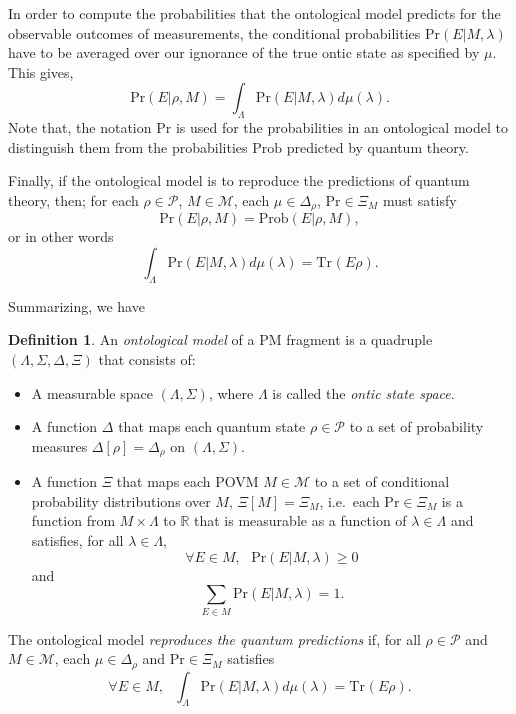 \documentclass[DIV=calc,paper=a4,fontsize=11pt,twocolumn]{scrartcl} %
\theoremstyle{definition}
\newtheorem{definition}{Definition}[section]
\theoremstyle{plain}
\newcommand{\Tr}[2][]{\ensuremath{\text{Tr}_{#1} \left ( #2 \right )}}
\begin{document}
In order to compute the probabilities that the ontological model
predicts for the observable outcomes of measurements, the conditional
probabilities $\text{Pr}(E|M,\lambda)$ have to be averaged over our
ignorance of the true ontic state as specified by $\mu$.  This
gives,
\begin{equation}
\text{Pr}(E|\rho,M) = \int_{\Lambda} \text{Pr}(E|M,\lambda)
d\mu(\lambda).
\end{equation}
Note that, the notation $\text{Pr}$ is used for the probabilities in
an ontological model to distinguish them from the probabilities
$\text{Prob}$ predicted by quantum theory.

Finally, if the ontological model is to reproduce the predictions of
quantum theory, then; for each $\rho \in \mathcal{P}$, $M \in
\mathcal{M}$, each $\mu \in \Delta_{\rho}$, $\text{Pr} \in \Xi_M$ must
satisfy
\begin{equation}
\label{eq:Form:Rep}
\text{Pr}(E|\rho,M) = \text{Prob}(E|\rho,M),
\end{equation}
or in other words
\begin{equation}
\label{eq:Form:RepQ}
\int_{\Lambda} \text{Pr}(E|M,\lambda) d\mu(\lambda) = \Tr{E \rho}.
\end{equation}

Summarizing, we have
\begin{definition}
\label{def:Form:OM}
An \emph{ontological model} of a PM fragment is a
quadruple $(\Lambda, \Sigma, \Delta, \Xi)$ that consists of:
\begin{itemize}
\item A measurable space $(\Lambda, \Sigma)$, where $\Lambda$ is
called the \emph{ontic state space}.
\item A function $\Delta$ that maps each quantum state $\rho \in
\mathcal{P}$ to a set of probability measures $\Delta[\rho] =
\Delta_{\rho}$ on $(\Lambda,\Sigma)$.
\item A function $\Xi$ that maps each POVM $M \in \mathcal{M}$ to a
set of conditional probability distributions over $M$, $\Xi[M] =
\Xi_M$, i.e.\ each $\text{Pr} \in \Xi_M$ is a function from $M
\times \Lambda$ to $\mathbb{R}$ that is measurable as a function
of $\lambda \in \Lambda$ and satisfies, for all $\lambda \in
\Lambda$,
\begin{equation}
\forall E \in M, \,\,\,\, \text{Pr}(E|M,\lambda) \geq 0
\end{equation}
and
\begin{equation}
\sum_{E \in M} \text{Pr}(E|M,\lambda) = 1.
\end{equation}
\end{itemize}

The ontological model \emph{reproduces the quantum predictions} if,
for all $\rho \in \mathcal{P}$ and $M \in \mathcal{M}$, each $\mu
\in \Delta_{\rho}$ and $\text{Pr} \in \Xi_M$ satisfies
\begin{equation}
\label{eq:Form:Rep2}
\forall E \in M, \,\,\,\, \int_{\Lambda} \text{Pr}(E|M,\lambda) d
\mu(\lambda) = \Tr{E \rho}.
\end{equation}
\end{definition}
\end{document}
